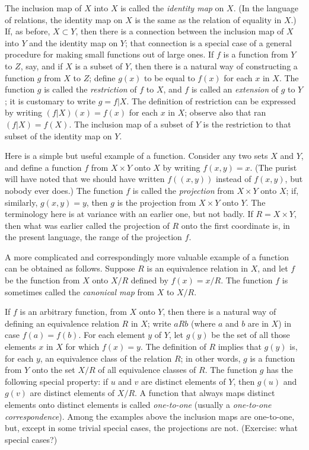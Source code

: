The inclusion map of $X$ into $X$ is called the \textit{identity map} on $X$. (In the language of relations, the identity map on $X$ is the same as the relation of equality in $X$.) If, as before, $X \subset Y$, then there is a connection between the inclusion map of $X$ into $Y$ and the identity map on $Y$; that connection is a special case of a general procedure for making small functions out of large ones. If $f$ is a function from $Y$ to $Z$, say, and if $X$ is a subset of $Y$, then there is a natural way of constructing a function $g$ from $X$ to $Z$; define $g(x)$ to be equal to $f(x)$ for each $x$ in $X$. The function $g$ is called the \textit{restriction} of $f$ to $X$, and $f$ is called an \textit{extension} of $g$ to $Y$; it is customary to write $g = f|X$. The definition of restriction can be expressed by writing $(f|X)(x) = f(x)$ for each $x$ in $X$; observe also that ran $(f|X) = f(X)$. The inclusion map of a subset of $Y$ is the restriction to that subset of the identity map on $Y$. 

Here is a simple but useful example of a function. Consider any two sets $X$ and $Y$, and define a function $f$ from $X \times Y$ onto $X$ by writing $f(x,y) = x$. (The purist  will have noted that we should have written $f((x, y))$ instead of $f(x, y)$, but nobody ever does.) The function $f$ is called the \textit{projection} from $X \times Y$ onto $X$; if, similarly, $g(x, y) = y$, then $g$ is the projection from $X \times Y$ onto $Y$. The terminology here is at variance with an earlier one, but not badly. If $R = X \times Y$, then what was earlier called the projection of $R$ onto the first coordinate is, in the present language, the range of the projection $f$.

A more complicated and correspondingly more valuable example of a function can be obtained as follows. Suppose $R$ is an equivalence relation in $X$, and let $f$ be the function from $X$ onto $X/R$ defined by $f(x) = x/R$. The function $f$ is sometimes called the \textit{canonical map} from $X$ to $X/R$.

If $f$ is an arbitrary function, from $X$ onto $Y$, then there is a natural way of defining an equivalence relation $R$ in $X$; write $a R b$ (where $a$ and $b$ are in $X$) in case $f(a) = f(b)$. For each element $y$ of $Y$, let $g(y)$ be the set of all those elements $x$ in $X$ for which $f(x) = y$. The definition of $R$ implies that $g(y)$ is, for each $y$, an equivalence class of the relation $R$; in other words, $g$ is a function from $Y$ onto the set $X/R$ of all equivalence classes of $R$. The function $g$ has the following special property: if $u$ and $v$ are distinct elements of $Y$, then $g(u)$ and $g(v)$ are distinct elements of $X/R$. A function that always maps distinct elements onto distinct elements is called \textit{one-to-one} (usually a \textit{one-to-one correspondence}). Among the examples above the inclusion maps are one-to-one, but, except in some trivial special cases, the projections are not. (Exercise: what special cases?)

